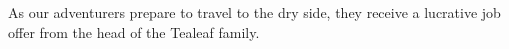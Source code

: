 As our adventurers prepare to travel to the dry side, they receive a lucrative job offer from the head of the Tealeaf family.
